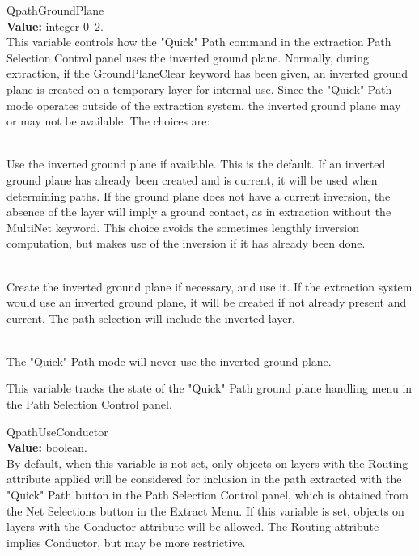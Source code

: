\begin{description}
\item{\et QpathGroundPlane}\\
{\bf Value:} integer 0--2.\\
This variable controls how the {\cb "Quick" Path} command in the
extraction {\cb Path Selection Control} panel uses the inverted ground
plane.  Normally, during extraction, if the {\et GroundPlaneClear}
keyword has been given, an inverted ground plane is created on a
temporary layer for internal use.  Since the {\cb "Quick" Path} mode
operates outside of the extraction system, the inverted ground plane
may or may not be available.  The choices are:

\begin{description}
\item{}\\
Use the inverted ground plane if available.  This is the default.  If
an inverted ground plane has already been created and is current, it
will be used when determining paths.  If the ground plane does not
have a current inversion, the absence of the layer will imply a ground
contact, as in extraction without the {\et MultiNet} keyword.  This
choice avoids the sometimes lengthly inversion computation, but makes
use of the inversion if it has already been done.

\item{}\\
Create the inverted ground plane if necessary, and use it.  If the  
extraction system would use an inverted ground plane, it will be  
created if not already present and current.  The path selection  
will include the inverted layer.  

\item{}\\
The {\cb "Quick" Path} mode will never use the inverted ground 
plane.
\end{description}

This variable tracks the state of the {\cb "Quick" Path ground plane
handling} menu in the {\cb Path Selection Control} panel.

\item{\et QpathUseConductor}\\
{\bf Value:} boolean.\\
By default, when this variable is not set, only objects on layers with
the {\et Routing} attribute applied will be considered for inclusion
in the path extracted with the {\cb "Quick" Path} button in the {\cb
Path Selection Control} panel, which is obtained from the {\cb Net
Selections} button in the {\cb Extract Menu}.  If this variable is
set, objects on layers with the {\et Conductor} attribute will be
allowed.  The {\et Routing} attribute implies {\et Conductor}, but may
be more restrictive.


\end{description}

